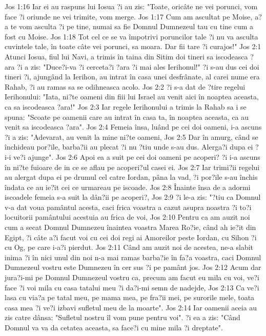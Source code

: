 Jos 1:16  Iar ei au raspuns lui Iosua ?i au zis: "Toate, oricâte ne vei porunci, vom face ?i oriunde ne vei trimite, vom merge.
Jos 1:17  Cum am ascultat pe Moise, a?a te vom asculta ?i pe tine, numai sa fie Domnul Dumnezeul tau cu tine cum a fost cu Moise.
Jos 1:18  Tot cel ce se va împotrivi poruncilor tale ?i nu va asculta cuvintele tale, în toate câte vei porunci, sa moara. Dar fii tare ?i curajos!"
Jos 2:1  Atunci Iosua, fiul lui Navi, a trimis în taina din Sitim doi tineri sa iscodeasca ?ara ?i a zis: "Duce?i-va ?i cerceta?i ?ara ?i mai ales Ierihonul!" ?i s-au dus cei doi tineri ?i, ajungând la Ierihon, au intrat în casa unei desfrânate, al carei nume era Rahab, ?i au ramas sa se odihneasca acolo.
Jos 2:2  ?i s-a dat de ?tire regelui Ierihonului: "Iata, ni?te oameni din fiii lui Israel au venit aici în noaptea aceasta, ca sa iscodeasca ?ara!"
Jos 2:3  Iar regele Ierihonului a trimis la Rahab sa i se spuna: "Scoate pe oamenii care au intrat în casa ta, în noaptea aceasta, ca au venit sa iscodeasca ?ara".
Jos 2:4  Femeia însa, luând pe cei doi oameni, i-a ascuns ?i a zis: "Adevarat, au venit la mine ni?te oameni,
Jos 2:5  Dar în amurg, când se închideau por?ile, barba?ii au plecat ?i nu ?tiu unde s-au dus. Alerga?i dupa ei ?i-i ve?i ajunge".
Jos 2:6  Apoi ea a suit pe cei doi oameni pe acoperi? ?i i-a ascuns în ni?te fuioare de in ce se aflau pe acoperi?ul casei ei.
Jos 2:7  Iar trimi?ii regelui au alergat dupa ei pe drumul cel catre Iordan, pâna la vad, ?i por?ile s-au închis îndata ce au ie?it cei ce urmareau pe iscoade.
Jos 2:8  Înainte însa de a adormi iscoadele femeia s-a suit la dân?ii pe acoperi?,
Jos 2:9  ?i le-a zis: "?tiu ca Domnul v-a dat voua pamântul acesta, caci frica voastra a cazut asupra noastra ?i to?i locuitorii pamântului acestuia au frica de voi,
Jos 2:10  Pentru ca am auzit noi cum a secat Domnul Dumnezeu înaintea voastra Marea Ro?ie, când ah ie?it din Egipt, ?i câte a?i facut voi cu cei doi regi ai Amoreilor peste Iordan, cu Sihon ?i cu Og, pe care i-a?i pierdut.
Jos 2:11  Când am auzit noi de acestea, ne-a slabit inima ?i în nici unul din noi n-a mai ramas barba?ie în fa?a voastra, caci Domnul Dumnezeul vostru este Dumnezeu în cer sus ?i pe pamânt jos.
Jos 2:12  Acum dar jura?i-mi pe Domnul Dumnezeul vostru ca, precum am facut eu mila cu voi, ve?i face ?i voi mila cu casa tatalui meu ?i da?i-mi semn de nadejde,
Jos 2:13  Ca ve?i lasa cu via?a pe tatal meu, pe mama mea, pe fra?ii mei, pe surorile mele, toata casa mea ?i ve?i izbavi sufletul meu de la moarte".
Jos 2:14  Iar oamenii aceia au zis catre dânsa: "Sufletul nostru îl vom pune pentru voi". ?i ea a zis: "Când Domnul va va da cetatea aceasta, sa face?i cu mine mila ?i dreptate".
